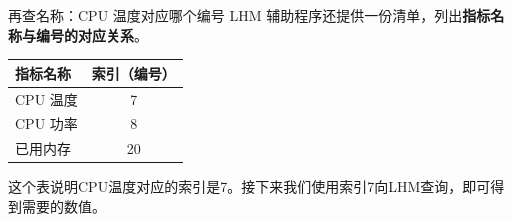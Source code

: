 \documentclass[aspectratio=169]{beamer}
\begin{document}
\begin{frame}{再查名称：CPU 温度对应哪个编号}
  LHM 辅助程序还提供一份清单，列出\textbf{指标名称与编号的对应关系}。
  \par\bigskip
  \begin{center}
    \begingroup
    \renewcommand{\arraystretch}{1.35}
    \begin{tabular}{lc}
      \textbf{指标名称} & \textbf{索引（编号）} \\
      \hline
      \alert{CPU 温度} & \alert{7} \\
      CPU 功率 & 8 \\
      已用内存 & 20 \\
    \end{tabular}
    \endgroup
  \end{center}
  \bigskip
  这个表说明CPU温度对应的索引是7。接下来我们使用索引7向LHM查询，即可得到需要的数值。
\end{frame}

\end{document}
